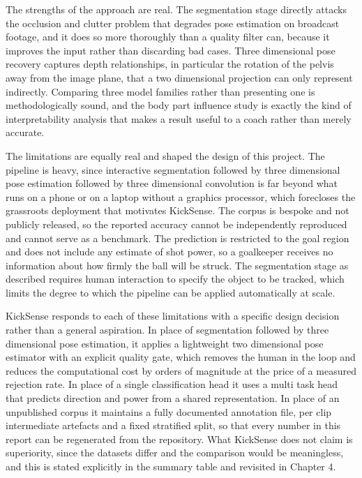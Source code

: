 The strengths of the approach are real. The segmentation stage directly attacks the occlusion and clutter problem that degrades pose estimation on broadcast footage, and it does so more thoroughly than a quality filter can, because it improves the input rather than discarding bad cases. Three dimensional pose recovery captures depth relationships, in particular the rotation of the pelvis away from the image plane, that a two dimensional projection can only represent indirectly. Comparing three model families rather than presenting one is methodologically sound, and the body part influence study is exactly the kind of interpretability analysis that makes a result useful to a coach rather than merely accurate.

The limitations are equally real and shaped the design of this project. The pipeline is heavy, since interactive segmentation followed by three dimensional pose estimation followed by three dimensional convolution is far beyond what runs on a phone or on a laptop without a graphics processor, which forecloses the grassroots deployment that motivates KickSense. The corpus is bespoke and not publicly released, so the reported accuracy cannot be independently reproduced and cannot serve as a benchmark. The prediction is restricted to the goal region and does not include any estimate of shot power, so a goalkeeper receives no information about how firmly the ball will be struck. The segmentation stage as described requires human interaction to specify the object to be tracked, which limits the degree to which the pipeline can be applied automatically at scale.

KickSense responds to each of these limitations with a specific design decision rather than a general aspiration. In place of segmentation followed by three dimensional pose estimation, it applies a lightweight two dimensional pose estimator with an explicit quality gate, which removes the human in the loop and reduces the computational cost by orders of magnitude at the price of a measured rejection rate. In place of a single classification head it uses a multi task head that predicts direction and power from a shared representation. In place of an unpublished corpus it maintains a fully documented annotation file, per clip intermediate artefacts and a fixed stratified split, so that every number in this report can be regenerated from the repository. What KickSense does not claim is superiority, since the datasets differ and the comparison would be meaningless, and this is stated explicitly in the summary table and revisited in Chapter 4.

